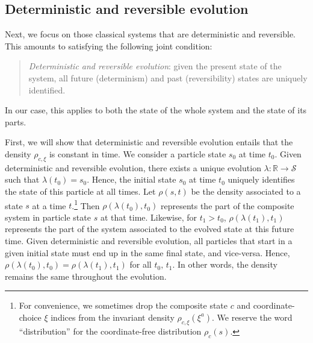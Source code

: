 \documentclass[12pt, english, twoside]{article} %
\newcommand\bs{\begin{singlespace}}
\newcommand\es{\end{singlespace}}
\begin{document}


\subsection{Deterministic and reversible evolution}
\label{deterministic}

Next, we focus on those classical systems that are deterministic and reversible. This amounts to satisfying the following joint condition:

\begin{quotation}
\bs
\noindent
\textit{Deterministic and reversible evolution}: given the present state of the system, all future (determinism) and past (reversibility) states are uniquely identified. \es
\end{quotation}

\noindent In our case, this applies to both the state of the whole system and the state of its parts. 

First, we will show that deterministic and reversible evolution entails that the density $\rho_{c, \xi}$ is constant in time. We consider a particle state $s_0$ at time $t_0$. Given deterministic and reversible evolution, there exists a unique evolution $\lambda: \mathbb{R} \to \mathcal{S}$ such that $\lambda(t_0) = s_0$. Hence, the initial state $s_0$ at time $t_0$ uniquely identifies the state of this particle at all times. Let $\rho(s, t)$ be the density associated to a state $s$ at a time $t$.\footnote{For convenience, we sometimes drop the composite state $c$ and coordinate-choice $\xi$ indices from the invariant density $\rho_{c, \xi} (\xi^a)$. We reserve the word ``distribution'' for the coordinate-free distribution $\rho_c (s)$. } Then  $\rho(\lambda(t_0), t_0)$ represents the part of the composite system in particle state $s$ at that time. Likewise, for $t_1 > t_0$,  $\rho(\lambda(t_1), t_1)$ represents the part of the system associated to the evolved state at this future time. Given deterministic and reversible evolution, all particles that start in a given initial state must end up in the same final state, and vice-versa. Hence, $\rho(\lambda(t_0), t_0) = \rho(\lambda(t_1), t_1)$ for all $t_0,\, t_1$. In other words, the density remains the same throughout the evolution.
\end{document}
